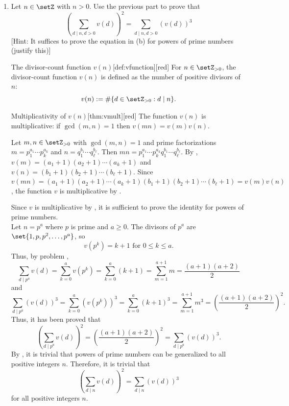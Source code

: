 \begin{enumerate}
\begin{enumerate}
    \item Let $n \in \setZ$ with $n>0$. Use the previous part to prove that
    $$
    \left(\sum_{d \mid n, d>0} v(d)\right)^2=\sum_{d \mid n, d>0}(v(d))^3
    $$
    [Hint: It suffices to prove the equation in (b) for powers of prime numbers (justify this)]
    \begin{define}{The divisor-count function $v(n)$}[def:vfunction][red]
    For $n\in\setZ_{>0}$, the divisor-count function $v(n)$ is defined as the number of positive divisors of $n$:
    \[
    v(n):=\#\{d\in\setZ_{>0}:d\mid n\}.
    \]
    \end{define}
    \begin{define}{Multiplicativity of $v(n)$}[thm:vmult][red]
    The function $v(n)$ is multiplicative: if $\gcd(m,n)=1$ then $v(mn)=v(m)v(n)$.
    \begin{subprove}
      Let $m,n \in \setZ_{>0}$ with $\gcd(m,n)=1$ and prime factorizations 
      $m = p_1^{a_1} \cdots p_k^{a_k}$ and $n = q_1^{b_1} \cdots q_\ell^{b_\ell}$.
      Then $mn = p_1^{a_1} \cdots p_k^{a_k} q_1^{b_1} \cdots q_\ell^{b_\ell}$.
      By , $v(m) = (a_1 + 1)(a_2 + 1) \cdots (a_k + 1)$ and 
      $v(n) = (b_1 + 1)(b_2 + 1) \cdots (b_\ell + 1)$.
      Since $v(mn) = (a_1 + 1)(a_2 + 1) \cdots (a_k + 1)(b_1 + 1)(b_2 + 1) \cdots (b_\ell + 1) = v(m)v(n)$,
      the function $v$ is multiplicative by .
    \end{subprove}
    \end{define}
    \begin{subprove}
      Since $v$ is multiplicative by , it is sufficient to 
      prove the identity for powers of prime numbers.\vspace*{10px}\\
      Let $n=p^a$ where $p$ is prime and $a\geq 0$. The divisors of $p^a$ are $\set{1,p,p^2,\ldots,p^a}$, 
      so 
      \[
      v(p^k)=k+1 \text{ for } 0\leq k\leq a.
      \]
      Thus, by problem ,
      \[
      \sum_{d\mid p^a} v(d) = \sum_{k=0}^a v(p^k) = \sum_{k=0}^a (k+1) = \sum_{m=1}^{a+1} m = \frac{(a+1)(a+2)}{2}
      \]
      and
      \[
      \sum_{d\mid p^a} (v(d))^3 = \sum_{k=0}^a (v(p^k))^3 = \sum_{k=0}^a (k+1)^3 
      = \sum_{m=1}^{a+1} m^3 = \left(\frac{(a+1)(a+2)}{2}\right)^2.
      \]
      Thus, it has been proved that 
      \[
      \left(\sum_{d\mid p^a} v(d)\right)^2 = \left(\frac{(a+1)(a+2)}{2}\right)^2 = \sum_{d\mid p^a} (v(d))^3.
      \]
      By , it is trivial that powers of prime numbers can be generalized to all positive integers $n$.
      Therefore, it is trivial that 
      \[
      \left(\sum_{d\mid n} v(d)\right)^2 = \sum_{d\mid n} (v(d))^3
      \]
      for all positive integers $n$.
    \end{subprove}
  \end{enumerate}


















\end{enumerate}
